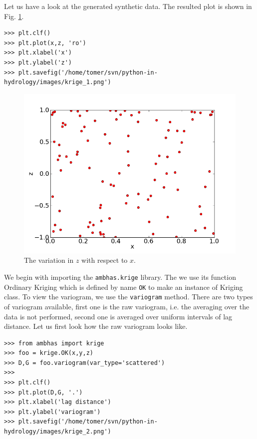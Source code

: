 \documentclass[10pt]{book}
\begin{document}
Let us have a look at the generated synthetic data. The resulted plot is shown in Fig. \ref{fig:krige_1}. 

\beforeverb \begin{verbatim}
>>> plt.clf()
>>> plt.plot(x,z, 'ro')
>>> plt.xlabel('x')
>>> plt.ylabel('z')
>>> plt.savefig('/home/tomer/svn/python-in-hydrology/images/krige_1.png')
\end{verbatim} \afterverb

\beforefig
\begin{figure}[h!]
  \centering
    \includegraphics[scale=0.5]{images/krige_1.png}
  \caption{The variation in $z$ with respect to $x$.}
   \label{fig:krige_1}
\end{figure}
\afterfig

We begin with importing the \verb"ambhas.krige" library. The we use its function Ordinary Kriging which is defined by name \verb"OK" to make an instance of Kriging class. To view the variogram, we use the \verb"variogram" method. There are two types of variogram available, first one is the raw variogram, i.e. the averaging over the data is not performed, second one is averaged over uniform intervals of lag distance. Let us first look how the raw variogram looks like. 

\beforeverb \begin{verbatim}
>>> from ambhas import krige
>>> foo = krige.OK(x,y,z)
>>> D,G = foo.variogram(var_type='scattered')
>>> 
>>> plt.clf()
>>> plt.plot(D,G, '.')
>>> plt.xlabel('lag distance')
>>> plt.ylabel('variogram')
>>> plt.savefig('/home/tomer/svn/python-in-hydrology/images/krige_2.png')
\end{verbatim} \afterverb
\end{document}
